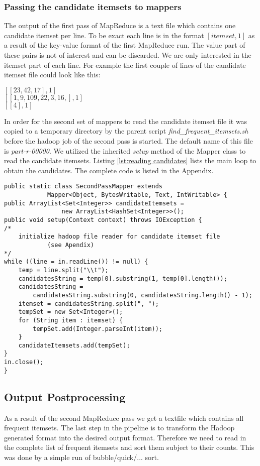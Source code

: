 \subsubsection{Passing the candidate itemsets to mappers}\label{passing candidates}
The output of the first pass of MapReduce is a text file which contains one candidate itemset per line. To be exact each line is in the format $[itemset, 1]$ as a result of the key-value format of the first MapReduce run. The value part of these pairs is not of interest and can be discarded. We are only interested in the itemset part of each line. For example the first couple of lines of the candidate itemset file could look like this:
\begin{center}
$[[23,42,17],1]$\\
$[[1,9,109,22,3,16,],1]$\\
$[[4],1]$
\end{center}
In order for the second set of mappers to read the candidate itemset file it was copied to a temporary directory by the parent script \textit{find\_frequent\_itemsets.sh} before the hadoop job of the second pass is started. The default name of this file is \textit{part-r-00000}. We utilized the inherited \textit{setup} method of the Mapper class to read the candidate itemsets. Listing \ref{lst:reading candidates} lists the main loop to obtain the candidates. The complete code is listed in the Appendix.
\begin{lstlisting}[caption={reading the candidate itemset file},captionpos=b,label={lst:reading candidates}]
public static class SecondPassMapper extends
			Mapper<Object, BytesWritable, Text, IntWritable> {
public ArrayList<Set<Integer>> candidateItemsets = 
				new ArrayList<HashSet<Integer>>();
public void setup(Context context) throws IOException {
/*
	initialize hadoop file reader for candidate itemset file
			(see Apendix)
*/
while ((line = in.readLine()) != null) {
	temp = line.split("\\t");
	candidatesString = temp[0].substring(1, temp[0].length());
	candidatesString = 
		candidatesString.substring(0, candidatesString.length() - 1);
	itemset = candidatesString.split(", ");
	tempSet = new Set<Integer>();
	for (String item : itemset) {
		tempSet.add(Integer.parseInt(item));
	}
	candidateItemsets.add(tempSet);
}
in.close();
}
\end{lstlisting}
\subsection{Output Postprocessing}\label{postprocessing}
As a result of the second MapReduce pass we get a textfile which contains all frequent itemsets.
The last step in the pipeline is to transform the Hadoop generated format into the desired output format. Therefore we need to read in the complete list of frequent itemsets and sort them subject to their counts. This was done by a simple run of bubble/quick/... sort.